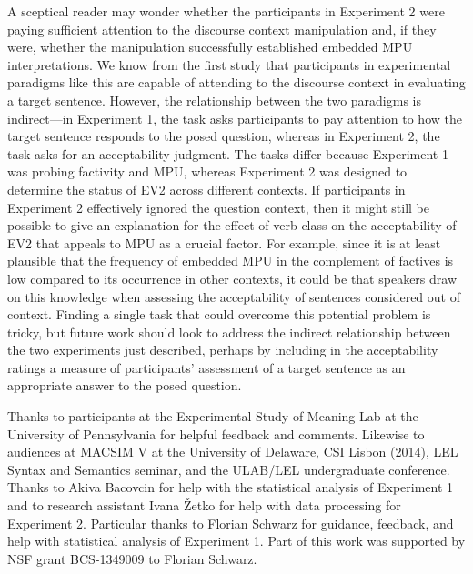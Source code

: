 \documentclass[output=paper]{LSP/langsci}
\begin{document}
A sceptical reader may wonder whether the participants in Experiment 2 were paying sufficient attention to the discourse context manipulation and, if they were, whether the manipulation successfully established embedded MPU interpretations.  We know from the first study that participants in experimental paradigms like this are capable of attending to the discourse context in evaluating a target sentence.  However, the relationship between the two paradigms is indirect---in Experiment 1, the task asks participants to pay attention to how the target sentence responds to the posed question, whereas in Experiment 2, the task asks for an acceptability judgment.  The tasks differ because Experiment 1 was probing factivity and MPU, whereas Experiment 2 was designed to determine the status of EV2 across different contexts.   If participants in Experiment 2 effectively ignored the question context, then it might still be possible to give an explanation for the effect of verb class on the acceptability of EV2 that appeals to MPU as a crucial factor. For example, since it is at least plausible that the frequency of embedded MPU in the complement of factives is low compared to its occurrence in other contexts, it could be that speakers draw on this knowledge when assessing the acceptability of sentences considered out of context. 
Finding a single task that could overcome this potential problem is tricky, but future work should look to address the indirect relationship between the two experiments just described, perhaps by including in the acceptability ratings a measure of participants' assessment of a target sentence as an appropriate answer to the posed question.



Thanks to participants at the Experimental Study of Meaning Lab at the University of Pennsylvania for helpful feedback and comments. Likewise to audiences at MACSIM V at the University of Delaware, CSI Lisbon (2014), LEL Syntax and Semantics seminar, and the ULAB/LEL undergraduate conference. Thanks to Akiva Bacovcin for help with the statistical analysis of Experiment 1 and to research assistant Ivana \v{Z}etko for help with data processing for Experiment 2. Particular thanks to Florian Schwarz for guidance, feedback, and help with statistical analysis of Experiment 1. Part of this work was supported by NSF grant BCS-1349009 to Florian Schwarz.
	

\printbibliography[heading=subbibliography,notkeyword=this]
\end{document}
